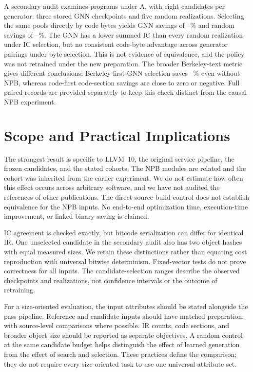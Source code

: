 \documentclass[conference,a4paper]{IEEEtran}
\begin{document}
A secondary audit examines \SelectorCount{} programs under A, with
eight candidates per generator: three stored GNN checkpoints and five
random realizations. Selecting the same pools directly by code bytes
yields GNN savings of \GnnCodeMin--\GnnCodeMax\% and random savings
of \RandomCodeMin--\RandomCodeMax\%. The GNN has a lower summed IC
than every random realization under IC selection, but no consistent
code-byte advantage across generator pairings under byte selection.
This is not evidence of equivalence, and the policy was not retrained
under the new preparation. The broader Berkeley-text metric gives
different conclusions: Berkeley-first GNN selection saves
\GnnBerkeleyWithoutMin--\GnnBerkeleyWithoutMax\% even without NPB,
whereas code-first code-section savings are close to zero or negative.
Full paired records are provided separately to keep this check
distinct from the causal NPB experiment.

\section{Scope and Practical Implications}
The strongest result is specific to LLVM~10, the original service
pipeline, the frozen candidates, and the stated cohorts. The NPB
modules are related and the cohort was inherited from the earlier
experiment. We do not estimate how often this effect occurs across
arbitrary software, and we have not audited the references of other
publications. The direct source-build control does not establish
equivalence for the NPB inputs. No end-to-end optimization time,
execution-time improvement, or linked-binary saving is claimed.

IC agreement is checked exactly, but bitcode serialization can differ
for identical IR. One unselected candidate in the secondary audit also
has two object hashes with equal measured sizes. We retain these
distinctions rather than equating cost reproduction with universal
bitwise determinism. Fixed-vector tests do not prove correctness for
all inputs. The candidate-selection ranges describe the observed
checkpoints and realizations, not confidence intervals or the outcome
of retraining.

For a size-oriented evaluation, the input attributes should be stated
alongside the pass pipeline. Reference and candidate inputs should
have matched preparation, with source-level comparisons where possible.
IR counts, code sections, and broader object size should be reported as
separate objectives. A random control at the same candidate budget
helps distinguish the effect of learned generation from the effect of
search and selection. These practices define the comparison; they do
not require every size-oriented task to use one universal attribute set.
\end{document}

